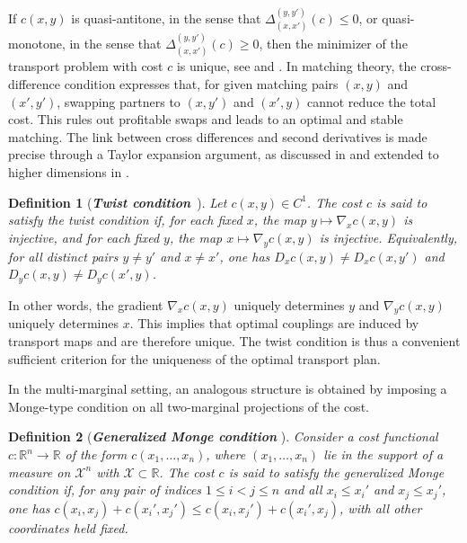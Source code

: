\documentclass[11pt]{article}
\newcommand{\calX}{{\mathcal X}}
\newtheorem{definition}{Definition}
\begin{document}
If $c(x,y)$ is quasi-antitone, in the sense that $\Delta_{(x,x')}^{(y,y')}(c) \leq 0$, or quasi-monotone, in the sense that $\Delta_{(x,x')}^{(y,y')}(c) \geq 0$, then the minimizer of the transport problem with cost $c$ is unique, see \cite{cambanis1976inequalities} and \cite[Theorem 3.1.2]{rachev1998mass}. In matching theory, the cross-difference condition expresses that, for given matching pairs $(x,y)$ and $(x', y')$, swapping partners to $(x,y')$ and $(x',y)$ cannot reduce the total cost. This rules out profitable swaps and leads to an optimal and stable matching. The link between cross differences and second derivatives is made precise through a Taylor expansion argument, as discussed in \cite{cambanis1976inequalities,carlier2003class,chiappori2016multidimensional} and extended to higher dimensions in \cite{pass2012local}.

\begin{definition}[{\it \bf Twist condition}~\cite{villani2009optimal}]
Let $c(x,y)\in C^1$. The cost $c$ is said to satisfy the twist condition if, for each fixed $x$, the map $y \mapsto \nabla_x c(x,y)$ is injective, and for each fixed $y$, the map $x \mapsto \nabla_y c(x,y)$ is injective. Equivalently, for all distinct pairs $y \neq y'$ and $x \neq x'$, one has
$D_x c(x, y) \neq D_x c(x, y')$ and 
$D_y c(x, y) \neq D_y c(x', y)$.
\end{definition}
In other words, the gradient $\nabla_x c(x,y)$ uniquely determines $y$ and $\nabla_y c(x,y)$ uniquely determines $x$. This implies that optimal couplings are induced by transport maps and are therefore unique. The twist condition is thus a convenient sufficient criterion for the uniqueness of the optimal transport plan.

In the multi-marginal setting, an analogous structure is obtained by imposing a Monge-type condition on all two-marginal projections of the cost.

\begin{definition}[{\it \bf Generalized Monge condition} \cite{rachev1998mass}]\label{def:genmonge}
Consider a cost functional $c:\mathbb{R}^n \to \mathbb{R}$ of the form $c(x_1,\dots,x_n)$, where $(x_1,\dots,x_n)$ lie in the support of a measure on $\calX^n$ with $\calX \subset \mathbb{R}$. The cost $c$ is said to satisfy the generalized Monge condition if, for any pair of indices $1 \leq i < j \leq n$ and all $x_i \leq x_i'$ and $x_j \leq x_j'$, one has $c(x_i,x_j) + c(x_i',x_j')
\leq c(x_i,x_j') + c(x_i',x_j)$,
with all other coordinates held fixed.
\end{definition}
\end{document}
